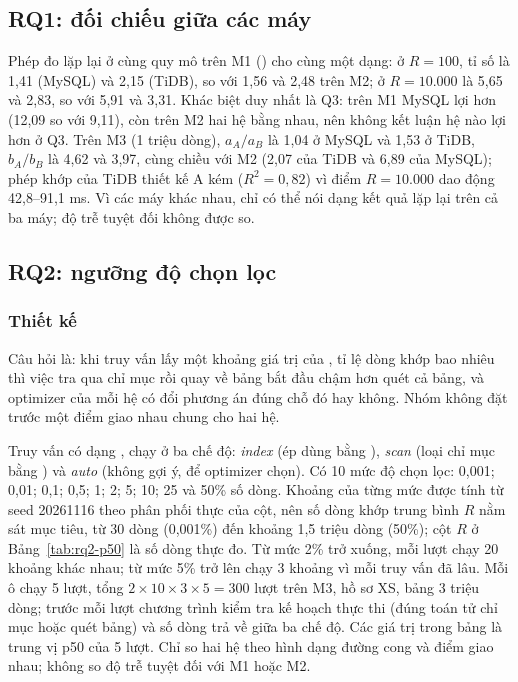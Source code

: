 \subsection{RQ1: đối chiếu giữa các máy}
Phép đo lặp lại ở cùng quy mô trên M1 () cho cùng một dạng: ở $R = 100$, tỉ số là 1,41 (MySQL) và 2,15 (TiDB), so với 1,56 và 2,48 trên M2; ở $R = 10.000$ là 5,65 và 2,83, so với 5,91 và 3,31. Khác biệt duy nhất là Q3: trên M1 MySQL lợi hơn (12,09 so với 9,11), còn trên M2 hai hệ bằng nhau, nên không kết luận hệ nào lợi hơn ở Q3. Trên M3 (1 triệu dòng), $a_A / a_B$ là 1,04 ở MySQL và 1,53 ở TiDB, $b_A / b_B$ là 4,62 và 3,97, cùng chiều với M2 (2,07 của TiDB và 6,89 của MySQL); phép khớp của TiDB thiết kế A kém ($R^2 = 0{,}82$) vì điểm $R = 10.000$ dao động 42,8--91,1 ms. Vì các máy khác nhau, chỉ có thể nói dạng kết quả lặp lại trên cả ba máy; độ trễ tuyệt đối không được so.

\subsection{RQ2: ngưỡng độ chọn lọc}

\subsubsection{Thiết kế}
Câu hỏi là: khi truy vấn lấy một khoảng giá trị của , tỉ lệ dòng khớp bao nhiêu thì việc tra qua chỉ mục  rồi quay về bảng bắt đầu chậm hơn quét cả bảng, và optimizer của mỗi hệ có đổi phương án đúng chỗ đó hay không. Nhóm không đặt trước một điểm giao nhau chung cho hai hệ.

Truy vấn có dạng , chạy ở ba chế độ: \emph{index} (ép dùng  bằng ), \emph{scan} (loại chỉ mục bằng ) và \emph{auto} (không gợi ý, để optimizer chọn). Có 10 mức độ chọn lọc: 0,001; 0,01; 0,1; 0,5; 1; 2; 5; 10; 25 và 50\% số dòng. Khoảng \code{[lo, hi]} của từng mức được tính từ seed 20261116 theo phân phối thực của cột, nên số dòng khớp trung bình $R$ nằm sát mục tiêu, từ 30 dòng (0,001\%) đến khoảng 1,5 triệu dòng (50\%); cột $R$ ở Bảng~\ref{tab:rq2-p50} là số dòng thực đo. Từ mức 2\% trở xuống, mỗi lượt chạy 20 khoảng khác nhau; từ mức 5\% trở lên chạy 3 khoảng vì mỗi truy vấn đã lâu. Mỗi ô chạy 5 lượt, tổng $2 \times 10 \times 3 \times 5 = 300$ lượt trên M3, hồ sơ XS, bảng 3 triệu dòng; trước mỗi lượt chương trình kiểm tra kế hoạch thực thi (đúng toán tử chỉ mục hoặc quét bảng) và số dòng trả về giữa ba chế độ. Các giá trị trong bảng là trung vị p50 của 5 lượt. Chỉ so hai hệ theo hình dạng đường cong và điểm giao nhau; không so độ trễ tuyệt đối với M1 hoặc M2.

